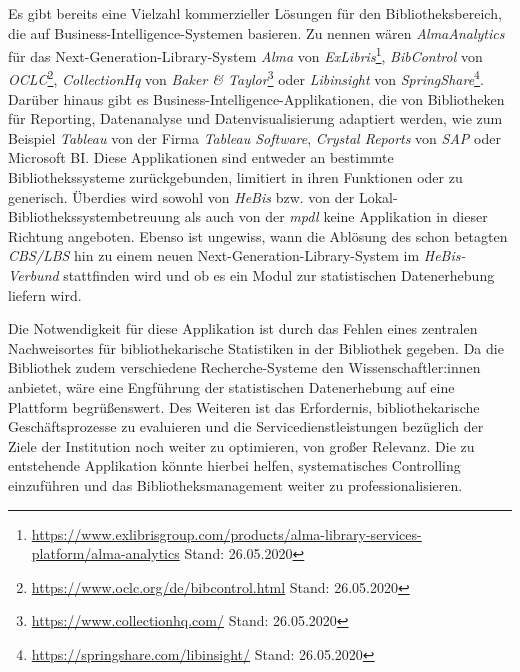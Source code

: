 Es gibt bereits eine Vielzahl kommerzieller Lösungen für den Bibliotheksbereich, die auf Business-Intelligence-Systemen basieren.
Zu nennen wären \textit{AlmaAnalytics} für das Next-Generation-Library-System \textit{Alma} von \textit{ExLibris}\footnote{\url{https://www.exlibrisgroup.com/products/alma-library-services-platform/alma-analytics}
Stand: 26.05.2020}, \textit{BibControl} von \textit{OCLC}\footnote{\url{https://www.oclc.org/de/bibcontrol.html} Stand: 26.05.2020},
\textit{CollectionHq} von \textit{Baker \& Taylor}\footnote{\url{https://www.collectionhq.com/} Stand: 26.05.2020} oder \textit{Libinsight} von \textit{SpringShare}\footnote{\url{https://springshare.com/libinsight/} Stand: 26.05.2020}.
Darüber hinaus gibt es Business-Intelligence-Applikationen, die von Bibliotheken für Reporting, Datenanalyse und Datenvisualisierung adaptiert werden,
wie zum Beispiel \textit{Tableau} von der Firma \textit{Tableau Software},
\textit{Crystal Reports} von \textit{SAP} oder Microsoft BI.
Diese Applikationen sind entweder an bestimmte Bibliothekssysteme zurückgebunden, limitiert in ihren
Funktionen\cite{golas_statistische_2018} oder zu generisch.
Überdies wird sowohl von \textit{HeBis} bzw. von der
Lokal-Bibliothekssystembetreuung als auch von der \textit{mpdl} keine Applikation
in dieser Richtung angeboten.
Ebenso ist ungewiss, wann die Ablösung des schon betagten \textit{CBS/LBS} hin zu
einem neuen Next-Generation-Library-System im \textit{HeBis-Verbund} stattfinden wird und ob
es ein Modul zur statistischen Datenerhebung liefern wird.

Die Notwendigkeit für diese Applikation ist durch das
Fehlen eines zentralen Nachweisortes für bibliothekarische
Statistiken in der Bibliothek gegeben. Da die Bibliothek zudem verschiedene Recherche-Systeme den
Wissenschaftler:innen anbietet, wäre eine Engführung der statistischen
Datenerhebung auf eine Plattform begrüßenswert.
Des Weiteren ist das Erfordernis, bibliothekarische Geschäftsprozesse zu evaluieren und die
Servicedienstleistungen bezüglich der Ziele der Institution noch weiter zu
optimieren, von großer Relevanz. 
Die zu entstehende Applikation könnte hierbei helfen, systematisches Controlling einzuführen und das
Bibliotheksmanagement weiter zu professionalisieren.



